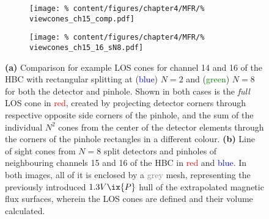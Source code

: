 %
            \begin{figure}[t]%
                \centering%
                \begin{subfigure}{0.47\textwidth}%
                    \texttt{[image: \%
                        content/figures/chapter4/MFR/\%
                        viewcones\_ch15\_comp.pdf]}%
                    \caption{}%
                \end{subfigure}%
                \hfill%
                \begin{subfigure}{0.47\textwidth}%
                    \texttt{[image: \%
                        content/figures/chapter4/MFR/\%
                        viewcones\_ch15\_16\_sN8.pdf]}%
                    \caption{}%
                \end{subfigure}%
                \caption{\textbf{(a)} Comparison for example LOS cones for channel 14 and 16 of the HBC with rectangular splitting at (\textcolor{blue}{blue}) $N=2$ and (\textcolor{green}{green}) $N=8$ for both the detector and pinhole. Shown in both cases is the \textit{full} LOS cone in \textcolor{red}{red}, created by projecting detector corners through respective opposite side corners of the pinhole, and the sum of the individual $N^{2}$ cones from the center of the detector elements through the corners of the pinhole rectangles in a different colour. \textbf{(b)} Line of sight cones from $N=8$ split detectors and pinholes of neighbouring channels 15 and 16 of the HBC in \textcolor{red}{red} and \textcolor{blue}{blue}. In both images, all of it is enclosed by a \textcolor{gray}{grey} mesh, representing the previously introduced $1.3V\ix{P}$ hull of the extrapolated magnetic flux surfaces, wherein the LOS cones are defined and their volume calculated.}\label{fig:viewconeComparison_N2_N8}%
            \end{figure}%
%
